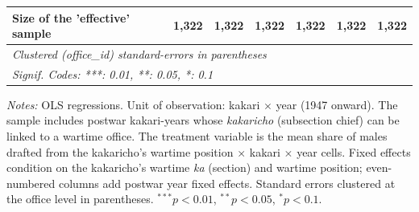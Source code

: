 \begin{table}[htbp]
\begin{threeparttable}
\begin{tabular}{lcccccc}
   Size of the 'effective' sample  & 1,322          & 1,322          & 1,322          & 1,322          & 1,322                  & 1,322\\  
   \midrule \midrule
   \multicolumn{7}{l}{\emph{Clustered (office\_id) standard-errors in parentheses}}\\
   \multicolumn{7}{l}{\emph{Signif. Codes: ***: 0.01, **: 0.05, *: 0.1}}\\
\end{tabular}
\begin{tablenotes}[flushleft]
\footnotesize
\item \textit{Notes:} OLS regressions. Unit of observation: kakari $\times$ year (1947 onward). The sample includes postwar kakari-years whose \emph{kakaricho} (subsection chief) can be linked to a wartime office. The treatment variable is the mean share of males drafted from the kakaricho's wartime position $\times$ kakari $\times$ year cells. Fixed effects condition on the kakaricho's wartime \emph{ka} (section) and wartime position; even-numbered columns add postwar year fixed effects. Standard errors clustered at the office level in parentheses. $^{***}p<0.01$, $^{**}p<0.05$, $^{*}p<0.1$.
\end{tablenotes}
\end{threeparttable}
\end{table}

